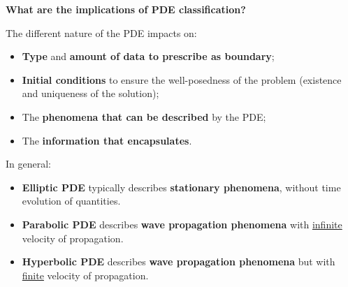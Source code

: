 \begin{flushleft}
    \textcolor{Green3}{ \textbf{What are the implications of PDE classification?}}
\end{flushleft}
The different nature of the PDE impacts on:
\begin{itemize}
    \item \textbf{Type} and \textbf{amount of data to prescribe as boundary};
    \item \textbf{Initial conditions} to ensure the well-posedness of the problem (existence and uniqueness of the solution);
    \item The \textbf{phenomena that can be described} by the PDE;
    \item The \textbf{information that encapsulates}.
\end{itemize}
In general:
\begin{itemize}
    \item \textbf{Elliptic PDE} typically describes \textbf{stationary phenomena}, without time evolution of quantities.
    \item \textbf{Parabolic PDE} describes \textbf{wave propagation phenomena} with \underline{infinite} velocity of propagation.
    \item \textbf{Hyperbolic PDE} describes \textbf{wave propagation phenomena} but with \underline{finite} velocity of propagation.
\end{itemize}